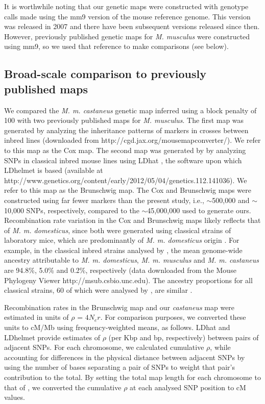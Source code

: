 It is worthwhile noting that our genetic maps were constructed with genotype calls made using the mm9 version of the mouse reference genome. This version was released in 2007 and there have been subsequent versions released since then. However, previously published genetic maps for \textit{M. musculus} were constructed using mm9, so we used that reference to make comparisons (see below).
 
\subsection{Broad-scale comparison to previously published maps}
 
We compared the \textit{M. m. castaneus} genetic map inferred using a block penalty of 100 with two previously published maps for \textit{M. musculus}. The first map was generated by analyzing the inheritance patterns of markers in crosses between inbred lines \citep{RN232} (downloaded from http://cgd.jax.org/mousemapconverter/). We refer to this map as the Cox map. The second map was generated by \cite{RN156} by analyzing SNPs in classical inbred mouse lines using LDhat \citep{RN260}, the software upon which LDhelmet is based (available at http://www.genetics.org/content/early/2012/05/04/genetics.112.141036). We refer to this map as the Brunschwig map. The Cox and Brunschwig maps were constructed using far fewer markers than the present study, i.e., $\sim$500,000 and $\sim$10,000 SNPs, respectively, compared to the $\sim$45,000,000 used to generate ours. Recombination rate variation in the Cox and Brunschwig maps likely reflects that of \textit{M. m. domesticus}, since both were generated using classical strains of laboratory mice, which are predominantly of \textit{M. m. domesticus} origin \citep{RN243}. For example, in the classical inbred strains analysed by \cite{RN213}, the mean genome-wide ancestry attributable to \textit{M. m. domesticus}, \textit{M. m. musculus} and \textit{M. m. castaneus} are 94.8\%, 5.0\% and 0.2\%, respectively (data downloaded from the Mouse Phylogeny Viewer \citep{RN280} http://msub.csbio.unc.edu). The ancestry proportions for all classical strains, 60 of which were analysed by \cite{RN156}, are similar \citep{RN243}.

Recombination rates in the Brunschwig map and our \textit{castaneus} map were estimated in units of $\rho$ = $4N_er$. For comparison purposes, we converted these units to cM/Mb using frequency-weighted means, as follows. LDhat and LDhelmet provide estimates of $\rho$ (per Kbp and bp, respectively) between pairs of adjacent SNPs. For each chromosome, we calculated cumulative $\rho$, while accounting for differences in the physical distance between adjacent SNPs by using the number of bases separating a pair of SNPs to weight that pair’s contribution to the total. By setting the total map length for each chromosome to that of \cite{RN232}, we converted the cumulative $\rho$ at each analysed SNP position to cM values.
 
